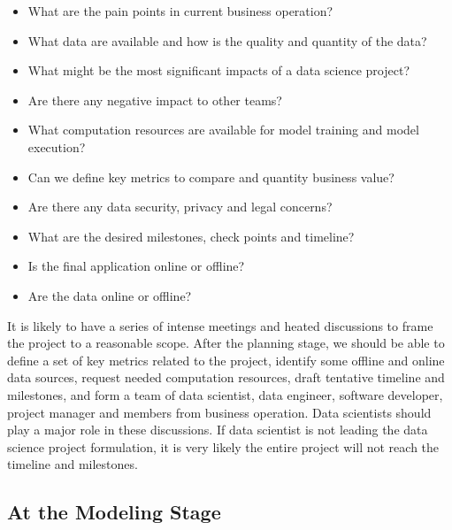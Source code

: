 \documentclass[12pt,]{krantz}
\providecommand{\tightlist}{%
  \setlength{\itemsep}{0pt}\setlength{\parskip}{0pt}}
\begin{document}
\begin{itemize}
\tightlist
\item
  What are the pain points in current business operation?
\item
  What data are available and how is the quality and quantity of the data?
\item
  What might be the most significant impacts of a data science project?
\item
  Are there any negative impact to other teams?
\item
  What computation resources are available for model training and model execution?
\item
  Can we define key metrics to compare and quantity business value?
\item
  Are there any data security, privacy and legal concerns?
\item
  What are the desired milestones, check points and timeline?
\item
  Is the final application online or offline?
\item
  Are the data online or offline?
\end{itemize}

It is likely to have a series of intense meetings and heated discussions to frame the project to a reasonable scope. After the planning stage, we should be able to define a set of key metrics related to the project, identify some offline and online data sources, request needed computation resources, draft tentative timeline and milestones, and form a team of data scientist, data engineer, software developer, project manager and members from business operation. Data scientists should play a major role in these discussions. If data scientist is not leading the data science project formulation, it is very likely the entire project will not reach the timeline and milestones.

\hypertarget{at-the-modeling-stage}{%
\subsection{At the Modeling Stage}\label{at-the-modeling-stage}}
\end{document}
